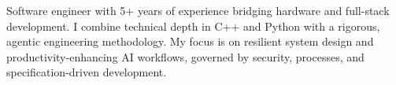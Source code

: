 
\begin{cvparagraph}
  Software engineer with 5+ years of experience bridging hardware and full-stack development. I combine technical depth in C++ and Python with a rigorous, agentic engineering methodology. My focus is on resilient system design and productivity-enhancing AI workflows, governed by security, processes, and specification-driven development.
\end{cvparagraph}
